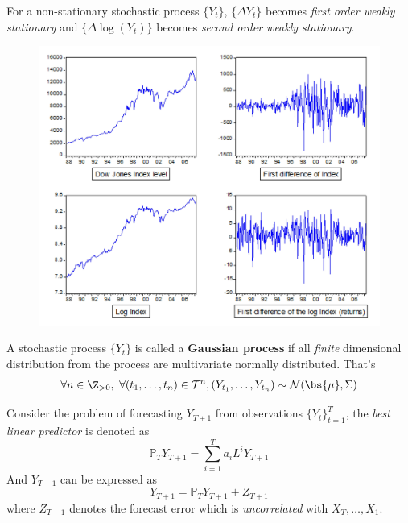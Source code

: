 \documentclass[11pt]{article}
\begin{document}
		\begin{proposition}
			For a non-stationary stochastic process $\{Y_t\}$, $\{\Delta Y_t\}$ becomes \emph{first order weakly stationary} and $\{\Delta \log(Y_t)\}$ becomes \emph{second order weakly stationary}.
			\begin{figure}[h]
				\centering
				\includegraphics{figures/2_1}
			\end{figure}
		\end{proposition}
		
		\begin{definition}[1.8]
			A stochastic process $\{Y_t\}$ is called a \textbf{Gaussian process} if all \emph{finite} dimensional distribution from the process are multivariate normally distributed. That's
			\begin{gather}
				\forall n \in \Z_{>0},\ \forall (t_1, \dots, t_n) \in \mc{T}^n, (Y_{t_1}, \dots, Y_{t_n}) \sim \mc{N}(\bs{\mu}, \Sigma)
			\end{gather}
		\end{definition}
		
		\begin{notation}
			Consider the problem of forecasting $Y_{T+1}$ from observations $\{Y_t\}_{t=1}^{T}$, the \emph{best linear predictor} is denoted as
			\begin{equation}
				\mathbb{P}_T Y_{T+1} = \sum_{i=1}^{T} a_i L^i Y_{T+1}
			\end{equation}
			And $Y_{T+1}$ can be expressed as
			\begin{equation}
				Y_{T+1} = \mathbb{P}_T Y_{T+1} + Z_{T+1}
			\end{equation}
			where $Z_{T+1}$ denotes the forecast error which is \emph{uncorrelated} with $X_T, \dots, X_1$.
		\end{notation}
		
\end{document}
